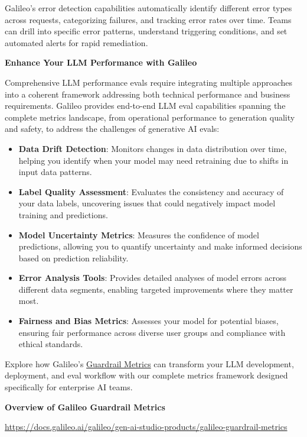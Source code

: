 \documentclass[
  letterpaper,
  DIV=11,
  numbers=noendperiod,
  oneside]{scrreprt}
\begin{document}
\begin{tcolorbox}
Galileo's error detection capabilities automatically identify different
error types across requests, categorizing failures, and tracking error
rates over time. Teams can drill into specific error patterns,
understand triggering conditions, and set automated alerts for rapid
remediation.

\textbf{Enhance Your LLM Performance with Galileo}

Comprehensive LLM performance evals require integrating multiple
approaches into a coherent framework addressing both technical
performance and business requirements. Galileo provides end-to-end LLM
eval capabilities spanning the complete metrics landscape, from
operational performance to generation quality and safety, to address the
challenges of generative AI evals:

\begin{itemize}
\item
  \textbf{Data Drift Detection}: Monitors changes in data distribution
  over time, helping you identify when your model may need retraining
  due to shifts in input data patterns.
\item
  \textbf{Label Quality Assessment}: Evaluates the consistency and
  accuracy of your data labels, uncovering issues that could negatively
  impact model training and predictions.
\item
  \textbf{Model Uncertainty Metrics}: Measures the confidence of model
  predictions, allowing you to quantify uncertainty and make informed
  decisions based on prediction reliability.
\item
  \textbf{Error Analysis Tools}: Provides detailed analyses of model
  errors across different data segments, enabling targeted improvements
  where they matter most.
\item
  \textbf{Fairness and Bias Metrics}: Assesses your model for potential
  biases, ensuring fair performance across diverse user groups and
  compliance with ethical standards.
\end{itemize}

Explore how Galileo's
\href{https://docs.galileo.ai/galileo/gen-ai-studio-products/galileo-guardrail-metrics}{Guardrail
Metrics} can transform your LLM development, deployment, and eval
workflow with our complete metrics framework designed specifically for
enterprise AI teams.

\textbf{Overview of Galileo Guardrail Metrics}

\url{https://docs.galileo.ai/galileo/gen-ai-studio-products/galileo-guardrail-metrics}


\end{tcolorbox}
\end{document}
